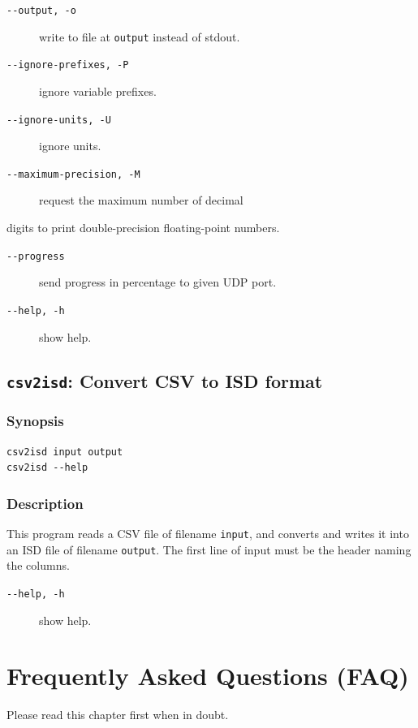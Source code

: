 \documentclass[a4paper,10pt]{report}
\begin{document}
\begin{description}
\item[{\texttt{-{}-output, -o}}] write to file at \texttt{output} instead of stdout.
\item[{\texttt{-{}-ignore-prefixes, -P}}] ignore variable prefixes.
\item[{\texttt{-{}-ignore-units, -U}}] ignore units.
\item[{\texttt{-{}-maximum-precision, -M}}] request the maximum number of decimal
\end{description}
digits to print double-precision floating-point numbers.
\begin{description}
\item[{\texttt{-{}-progress}}] send progress in percentage to given UDP port.
\item[{\texttt{-{}-help, -h}}] show help.
\end{description}

\section{\label{orgab1ee78} \texttt{csv2isd}: Convert CSV to ISD format}
\label{sec:org840a1c5}

\subsection{Synopsis}
\label{sec:org2f8b6f9}
\begin{verbatim}
csv2isd input output
csv2isd --help
\end{verbatim}

\subsection{Description}
\label{sec:org16a0d58}
This program reads a CSV file of filename \texttt{input}, and converts and writes
it into an ISD file of filename \texttt{output}.
The first line of input must be the header naming the columns.

\begin{description}
\item[{\texttt{-{}-help, -h}}] show help.
\end{description}

\chapter{Frequently Asked Questions (FAQ)}
\label{sec:org83e183a}
Please read this chapter first when in doubt.
\end{document}
